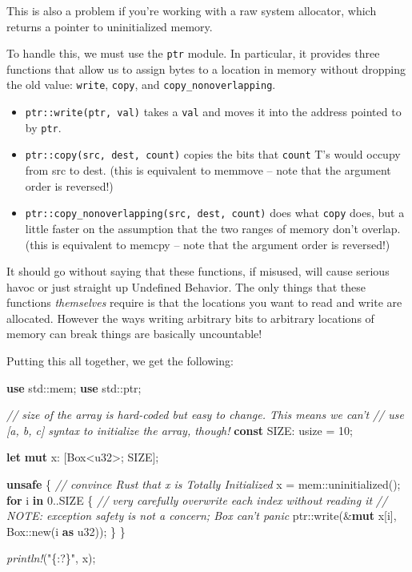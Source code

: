 \documentclass[a4paper,]{book}
\newenvironment{Shaded}{\begin{snugshade}}{\end{snugshade}}
\newcommand{\KeywordTok}[1]{\textcolor[rgb]{0.13,0.29,0.53}{\textbf{{#1}}}}
\newcommand{\DataTypeTok}[1]{\textcolor[rgb]{0.13,0.29,0.53}{{#1}}}
\newcommand{\DecValTok}[1]{\textcolor[rgb]{0.00,0.00,0.81}{{#1}}}
\newcommand{\StringTok}[1]{\textcolor[rgb]{0.31,0.60,0.02}{{#1}}}
\newcommand{\CommentTok}[1]{\textcolor[rgb]{0.56,0.35,0.01}{\textit{{#1}}}}
\newcommand{\PreprocessorTok}[1]{\textcolor[rgb]{0.56,0.35,0.01}{\textit{{#1}}}}
\newcommand{\NormalTok}[1]{{#1}}
\providecommand{\tightlist}{%
  \setlength{\itemsep}{0pt}\setlength{\parskip}{0pt}}
\begin{document}
This is also a problem if you're working with a raw system allocator,
which returns a pointer to uninitialized memory.

To handle this, we must use the \texttt{ptr} module. In particular, it
provides three functions that allow us to assign bytes to a location in
memory without dropping the old value: \texttt{write}, \texttt{copy},
and \texttt{copy\_nonoverlapping}.

\begin{itemize}
\tightlist
\item
  \texttt{ptr::write(ptr,\ val)} takes a \texttt{val} and moves it into
  the address pointed to by \texttt{ptr}.
\item
  \texttt{ptr::copy(src,\ dest,\ count)} copies the bits that
  \texttt{count} T's would occupy from src to dest. (this is equivalent
  to memmove -- note that the argument order is reversed!)
\item
  \texttt{ptr::copy\_nonoverlapping(src,\ dest,\ count)} does what
  \texttt{copy} does, but a little faster on the assumption that the two
  ranges of memory don't overlap. (this is equivalent to memcpy -- note
  that the argument order is reversed!)
\end{itemize}

It should go without saying that these functions, if misused, will cause
serious havoc or just straight up Undefined Behavior. The only things
that these functions \emph{themselves} require is that the locations you
want to read and write are allocated. However the ways writing arbitrary
bits to arbitrary locations of memory can break things are basically
uncountable!

Putting this all together, we get the following:

\begin{Shaded}
\begin{Highlighting}[]
\KeywordTok{use} \NormalTok{std::mem;}
\KeywordTok{use} \NormalTok{std::ptr;}

\CommentTok{// size of the array is hard-coded but easy to change. This means we can't}
\CommentTok{// use [a, b, c] syntax to initialize the array, though!}
\KeywordTok{const} \NormalTok{SIZE: }\DataTypeTok{usize} \NormalTok{= }\DecValTok{10}\NormalTok{;}

\KeywordTok{let} \KeywordTok{mut} \NormalTok{x: [}\DataTypeTok{Box}\NormalTok{<}\DataTypeTok{u32}\NormalTok{>; SIZE];}

\KeywordTok{unsafe} \NormalTok{\{}
    \CommentTok{// convince Rust that x is Totally Initialized}
    \NormalTok{x = mem::uninitialized();}
    \KeywordTok{for} \NormalTok{i }\KeywordTok{in} \DecValTok{0.}\NormalTok{.SIZE \{}
        \CommentTok{// very carefully overwrite each index without reading it}
        \CommentTok{// NOTE: exception safety is not a concern; Box can't panic}
        \NormalTok{ptr::write(&}\KeywordTok{mut} \NormalTok{x[i], }\DataTypeTok{Box}\NormalTok{::new(i }\KeywordTok{as} \DataTypeTok{u32}\NormalTok{));}
    \NormalTok{\}}
\NormalTok{\}}

\PreprocessorTok{println!}\NormalTok{(}\StringTok{"\{:?\}"}\NormalTok{, x);}
\end{Highlighting}
\end{Shaded}
\end{document}
